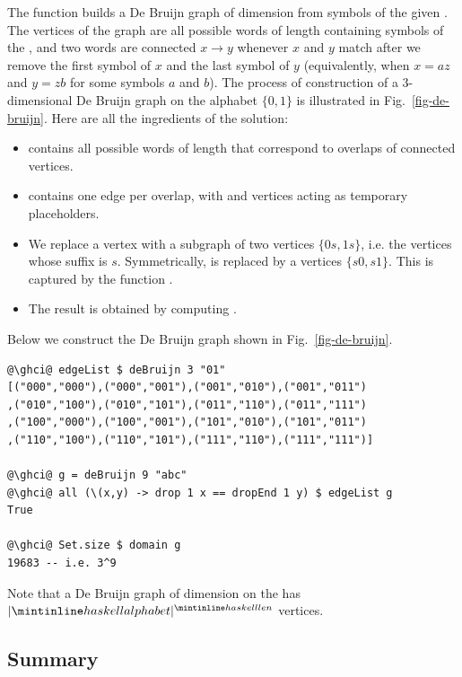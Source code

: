 The function builds a De Bruijn graph of dimension  from symbols of the given
. The vertices of the graph are all possible words of length 
containing symbols of the , and two words are connected $x \rightarrow y$
whenever $x$ and $y$ match after we remove the first symbol of $x$ and the last symbol
of $y$ (equivalently, when $x = az$ and $y = zb$ for some symbols $a$ and $b$).
The process of construction of a 3-dimensional De Bruijn graph on the alphabet
$\{0, 1\}$ is illustrated in Fig.~\ref{fig-de-bruijn}. Here are all the ingredients
of the solution:
\begin{itemize}
    \item {} contains all possible words of length  that
    correspond to overlaps of connected vertices.
    \item {} contains one edge per overlap, with  and
     vertices acting as temporary placeholders.
    \item We replace a vertex  with a subgraph of two vertices
    $\{0s, 1s\}$, i.e. the vertices whose suffix is $s$. Symmetrically,
     is replaced by a vertices $\{s0, s1\}$. This is captured
    by the function .
    \item The result is obtained by computing   .
\end{itemize}

Below we construct the De Bruijn graph shown in Fig.~\ref{fig-de-bruijn}.
\begin{verbatim}
@\ghci@ edgeList $ deBruijn 3 "01"
[("000","000"),("000","001"),("001","010"),("001","011")
,("010","100"),("010","101"),("011","110"),("011","111")
,("100","000"),("100","001"),("101","010"),("101","011")
,("110","100"),("110","101"),("111","110"),("111","111")]

@\ghci@ g = deBruijn 9 "abc"
@\ghci@ all (\(x,y) -> drop 1 x == dropEnd 1 y) $ edgeList g
True

@\ghci@ Set.size $ domain g
19683 -- i.e. 3^9
\end{verbatim}

\noindent
Note that a De Bruijn graph of dimension  on the  has
$|\hs{alphabet}|^{\hs{len}}$ vertices.

\subsection{Summary}\label{sub-library-summary}

